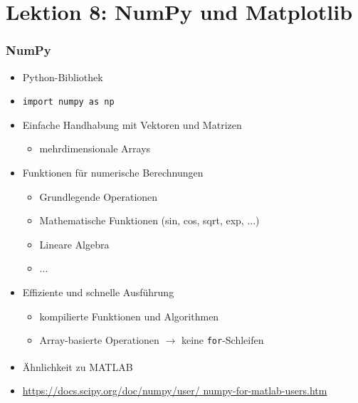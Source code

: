 \part*{Lektion 8: NumPy und Matplotlib}
\section{NumPy}
\begin{itemize}
	\item Python-Bibliothek
	\item[\-] \texttt{import numpy as np}
	\item Einfache Handhabung mit Vektoren und Matrizen
	\begin{itemize}
		\item mehrdimensionale Arrays
	\end{itemize}
	\item Funktionen für numerische Berechnungen
	\begin{itemize}
		\item Grundlegende Operationen
		\item Mathematische Funktionen (sin, cos, sqrt, exp, ...)
		\item Lineare Algebra
		\item ...
	\end{itemize}
	\item Effiziente und schnelle Ausführung
	\begin{itemize}
		\item kompilierte Funktionen und Algorithmen
		\item Array-basierte Operationen $\rightarrow$ keine \texttt{for}-Schleifen
	\end{itemize}
	\item Ähnlichkeit zu MATLAB\textsuperscript{\textregistered}
	\item[\-] \url{https://docs.scipy.org/doc/numpy/user/ numpy-for-matlab-users.htm}
\end{itemize}

